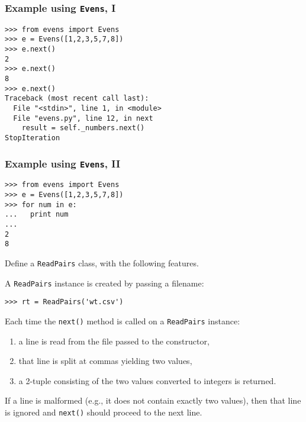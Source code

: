 \documentclass[english,serif,mathserif,xcolor=pdftex,dvipsnames,table]{beamer}
\begin{document}
\begin{frame}[fragile]
  \frametitle{Example using \texttt{Evens}, I}
\begin{lstlisting}
>>> from evens import Evens
>>> e = Evens([1,2,3,5,7,8])
>>> e.next()
2
>>> e.next()
8
>>> e.next()
Traceback (most recent call last):
  File "<stdin>", line 1, in <module>
  File "evens.py", line 12, in next
    result = self._numbers.next()
StopIteration
\end{lstlisting}
\end{frame}


\begin{frame}[fragile]
  \frametitle{Example using \texttt{Evens}, II}
\begin{lstlisting}
>>> from evens import Evens
>>> e = Evens([1,2,3,5,7,8])
>>> for num in e:
...   print num
...
2
8
\end{lstlisting}
\end{frame}


\begin{frame}[fragile]
  \begin{exercise}\small
    Define a \texttt{ReadPairs} class, with the following features.

    \+ A \texttt{ReadPairs} instance is created by passing a filename:
\begin{lstlisting}
>>> rt = ReadPairs('wt.csv')
\end{lstlisting}

    \+ Each time the \texttt{next()} method is called on a \texttt{ReadPairs} instance:
    \begin{enumerate}
    \item a line is read from the file passed to the constructor,
    \item that line is split at commas yielding two values,
    \item a 2-tuple consisting of the two values converted to integers is returned.
    \end{enumerate}

    \+ If a line is malformed (e.g., it does not contain exactly two
    values), then that line is ignored and \texttt{next()} should
    proceed to the next line.
  \end{exercise}
\end{frame}
\end{document}
